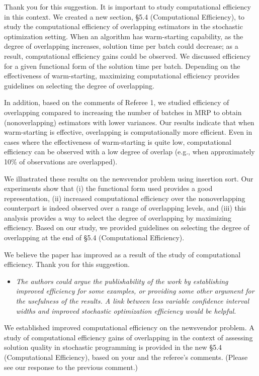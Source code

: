 \documentclass[11pt,notitlepage,onecolumn]{article}
\newcommand{\noi}{\noindent}
\begin{document}
\noi 
Thank you for this suggestion. 
It is important to study computational efficiency in this context. 
We created a new section, \S 5.4 (Computational Efficiency), to study the computational efficiency of overlapping estimators in the stochastic optimization setting. 
When an algorithm has warm-starting capability, as the degree of overlapping increases,  solution time per batch could decrease; as a result, computational efficiency gains could be observed.  
We discussed efficiency for a given functional form of the solution time per batch. 
Depending on the effectiveness of warm-starting, maximizing computational efficiency provides guidelines on selecting the degree of overlapping. 
\medskip 


In addition, based on the comments of Referee 1, we studied efficiency of overlapping compared to increasing the number of batches in MRP to obtain (nonoverlapping) estimators with lower variances. 
Our results indicate that when warm-starting is effective, overlapping is computationally more efficient.
Even in cases where the effectiveness of warm-starting is quite low, computational efficiency can be observed with a low degree of overlap (e.g., when approximately 10\% of observations are overlapped).\medskip 


We illustrated these results on the newsvendor problem using insertion sort. 
Our experiments show that (i) the functional form used provides a good representation, (ii) increased computational efficiency over the nonoverlapping counterpart is indeed observed over a range of overlapping levels, and (iii) this analysis provides a way to select the degree of overlapping by maximizing efficiency. 
Based on our study, we provided guidelines on selecting the degree of overlapping at the end of \S 5.4 (Computational Efficiency). 
\medskip 


We believe the paper has improved as a result of the study of computational efficiency. 
Thank you for this suggestion. 
\medskip 


\begin{itemize}
\item[] \textit{The authors could argue the publishability of the work by establishing improved efficiency for some examples, or providing some other argument for the usefulness of the results.  
A link between less variable confidence interval widths and improved stochastic optimization efficiency would be helpful.}
\end{itemize}

\noi 
We established improved computational efficiency on the newsvendor problem.
A study of computational efficiency gains of overlapping in the context of assessing solution quality in stochastic programming is provided in the new \S 5.4 (Computational Efficiency), based on your and the referee's comments. 
(Please see our response to the previous comment.)
\medskip
\end{document}
